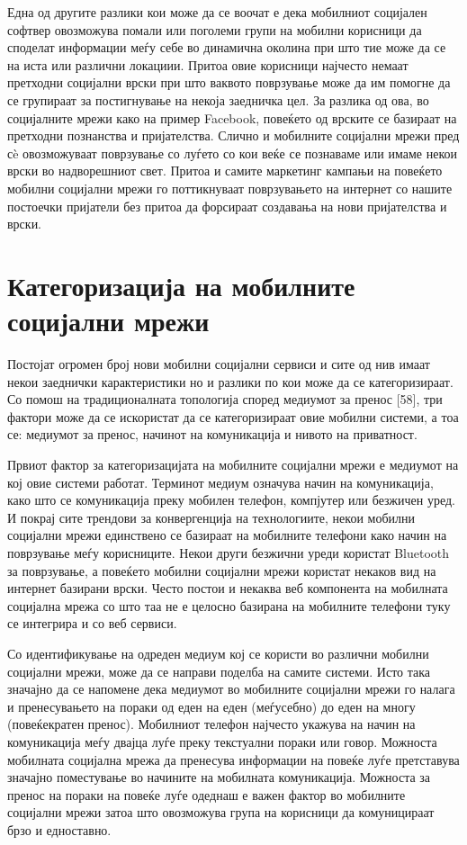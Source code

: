 Една од другите разлики кои може да се воочат е дека мобилниот социјален софтвер
овозможува помали или поголеми групи на мобилни корисници да споделат информации
меѓу себе во динамична околина при што тие може да се на иста или различни
локациии. Притоа овие корисници најчесто немаат претходни социјални врски при
што ваквото поврзување може да им помогне да се групираат за постигнување на
некоја заедничка цел. За разлика од ова, во социјалните мрежи како на пример
Facebook, повеќето од врските се базираат на претходни познанства и
пријателства. Слично и мобилните социјални мрежи пред сè овозможуваат поврзување
со луѓето со кои веќе се познаваме или имаме некои врски во надворешниот свет.
Притоа и самите маркетинг кампањи на повеќето мобилни социјални мрежи го
поттикнуваат поврзувањето на интернет со нашите постоечки пријатели без притоа
да форсираат создавања на нови пријателства и врски.

\section{Категоризација на мобилните социјални мрежи} 

Постојат огромен број нови мобилни социјални сервиси и сите од нив имаат некои
заеднички карактеристики но и разлики по кои може да се категоризираат. Со помош
на традиционалната топологија според медиумот за пренос [58], три фактори може
да се искористат да се категоризираат овие мобилни системи, а тоа се: медиумот
за пренос, начинот на комуникација и нивото на приватност.

Првиот фактор за категоризацијата на мобилните социјални мрежи е медиумот на кој
овие системи работат. Терминот медиум означува начин на комуникација, како што
се комуникација преку мобилен телефон, компјутер или безжичен уред. И покрај
сите трендови за конвергенција на технологиите, некои мобилни социјални мрежи
единствено се базираат на мобилните телефони како начин на поврзување меѓу
корисниците. Некои други безжични уреди користат Bluetooth за поврзување, а
повеќето мобилни социјални мрежи користат некаков вид на интернет базирани
врски. Често постои и некаква веб компонента на мобилната социјална мрежа со што
таа не е целосно базирана на мобилните телефони туку се интегрира и со веб
сервиси.

Со идентификување на одреден медиум кој се користи во различни мобилни социјални
мрежи, може да се направи поделба на самите системи. Исто така значајно да се
напомене дека медиумот во мобилните социјални мрежи го налага и пренесувањето на
пораки од еден на еден (меѓусебно) до еден на многу (повеќекратен пренос).
Мобилниот телефон најчесто укажува на  начин на комуникација меѓу двајца луѓе
преку текстуални пораки или говор. Можноста мобилната социјална мрежа да
пренесува информации на повеќе луѓе претставува значајно поместување во начините
на мобилната комуникација. Можноста за пренос на пораки на повеќе луѓе одеднаш е
важен фактор во мобилните социјални мрежи затоа што овозможува група на
корисници да комуницираат брзо и едноставно.


